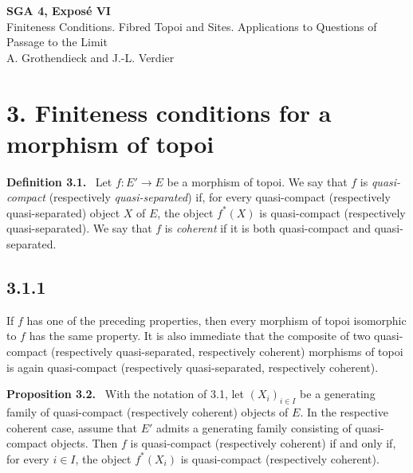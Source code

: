 \documentclass[11pt]{article}
\newenvironment{statement}[1]{\par\medskip\noindent\textbf{#1.}\ }{\par\medskip}
\begin{document}

\begin{center}
{\Large \textbf{SGA 4, Expos\'e VI}}\\[0.35em]
{\large Finiteness Conditions. Fibred Topoi and Sites. Applications to Questions of Passage to the Limit}\\[0.25em]
{\normalsize A. Grothendieck and J.-L. Verdier}
\end{center}

\bigskip

\section*{3. Finiteness conditions for a morphism of topoi}

\begin{statement}{Definition 3.1}
Let \(f:E'\to E\) be a morphism of topoi. We say that \(f\) is \emph{quasi-compact} (respectively \emph{quasi-separated}) if, for every quasi-compact (respectively quasi-separated) object \(X\) of \(E\), the object \(f^*(X)\) is quasi-compact (respectively quasi-separated). We say that \(f\) is \emph{coherent} if it is both quasi-compact and quasi-separated.
\end{statement}

\subsection*{3.1.1}
If \(f\) has one of the preceding properties, then every morphism of topoi isomorphic to \(f\) has the same property. It is also immediate that the composite of two quasi-compact (respectively quasi-separated, respectively coherent) morphisms of topoi is again quasi-compact (respectively quasi-separated, respectively coherent).

\begin{statement}{Proposition 3.2}
With the notation of 3.1, let \((X_i)_{i\in I}\) be a generating family of quasi-compact (respectively coherent) objects of \(E\). In the respective coherent case, assume that \(E'\) admits a generating family consisting of quasi-compact objects. Then \(f\) is quasi-compact (respectively coherent) if and only if, for every \(i\in I\), the object \(f^*(X_i)\) is quasi-compact (respectively coherent).
\end{statement}
\end{document}
